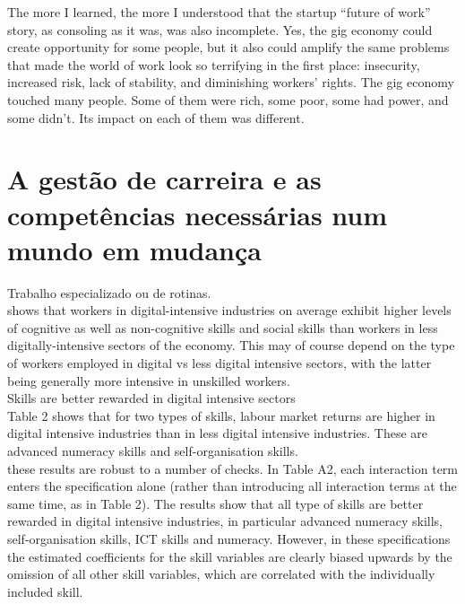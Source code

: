 The more I learned, the more I understood that the startup “future of work” story, as consoling as it was, was also incomplete. Yes, the gig economy could create opportunity for some people, but it also could amplify the same problems that made the world of work look so terrifying in the first place: insecurity, increased risk, lack of stability, and diminishing workers’ rights. The gig economy touched many people. Some of them were rich, some poor, some had power, and some didn’t. Its impact on each of them was different.


\newpage
\section{A gestão de carreira e as competências necessárias num mundo em mudança}


Trabalho especializado ou de rotinas.\\

shows that workers in digital-intensive industries on average exhibit higher levels of cognitive as well as non-cognitive skills and social skills than workers in less digitally-intensive sectors of the economy. This may of course depend on the type of workers employed in digital vs less digital intensive sectors, with the latter being generally more intensive in unskilled workers.\\

Skills are better rewarded in digital intensive sectors\\

Table 2 shows that for two types of skills, labour market returns are higher in digital intensive industries than in less digital intensive industries. These are advanced numeracy skills and self-organisation skills.\\

these results are robust to a number of checks. In Table A2, each interaction term enters the specification alone (rather than introducing all interaction terms at the same time, as in Table 2). The results show that all type of skills are better rewarded in digital intensive industries, in particular advanced numeracy skills, self-organisation skills, ICT skills and numeracy. However, in these specifications the estimated coefficients for the skill variables are clearly biased upwards by the omission of all other skill variables, which are correlated with the individually included skill.\\



